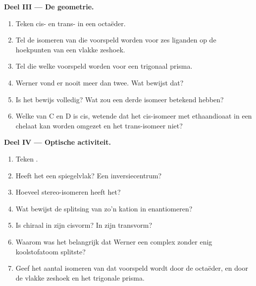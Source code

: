 \begin{problem}
\medskip
\noindent\textbf{Deel III --- De geometrie.}
\begin{enumerate}[resume]
  \item Teken cis- en trans-\ce{[CoCl2(NH3)4]+} in een octaëder.
  \item Tel de isomeren van \ce{[CoCl2(NH3)4]+} die voorspeld worden voor zes liganden op de
        hoekpunten van een vlakke zeshoek.
  \item Tel die welke voorspeld worden voor een trigonaal prisma.
  \item Werner vond er nooit meer dan twee. Wat bewijst dat?
  \item Is het bewijs volledig? Wat zou een derde isomeer betekend hebben?
  \item Welke van C en D is cis, wetende dat het cis-isomeer met ethaandioaat in een
        chelaat kan worden omgezet en het trans-isomeer niet?
\end{enumerate}

\medskip
\noindent\textbf{Deel IV --- Optische activiteit.}
\begin{enumerate}[resume]
  \item Teken .
  \item Heeft het een spiegelvlak? Een inversiecentrum?
  \item Hoeveel stereo-isomeren heeft het?
  \item Wat bewijst de splitsing van zo'n kation in enantiomeren?
  \item Is \ce{[CoCl2(en)2]+} chiraal in zijn cisvorm? In zijn transvorm?
  \item Waarom was het belangrijk dat Werner een complex zonder enig koolstofatoom splitste?
  \item Geef het aantal isomeren van \ce{[CoCl2(NH3)4]+} dat voorspeld wordt door de octaëder,
        en door de vlakke zeshoek en het trigonale prisma.
\end{enumerate}
\end{problem}
